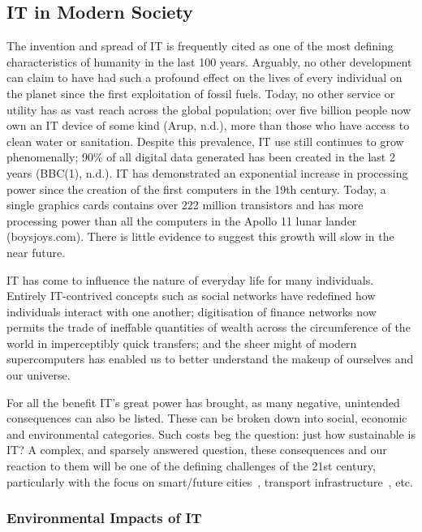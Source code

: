 \documentclass[conference]{IEEEtran}
\begin{document}
\subsection{IT in Modern Society}

The invention and spread of IT is frequently cited as one of the most
defining characteristics of humanity in the last 100 years. Arguably,
no other development can claim to have had such a profound effect on
the lives of every individual on the planet since the first
exploitation of fossil fuels. Today, no other service or utility has
as vast reach across the global population; over five billion people
now own an IT device of some kind (Arup, n.d.), more than those who
have access to clean water or sanitation. Despite this prevalence, IT
use still continues to grow phenomenally; 90\% of all digital data
generated has been created in the last 2 years (BBC(1),
n.d.). IT has demonstrated an exponential increase in
processing power since the creation of the first computers in the 19th
century. Today, a single graphics cards contains over 222 million
transistors and has more processing power than all the computers in
the Apollo 11 lunar lander (boysjoys.com). There is little evidence to
suggest this growth will slow in the near future.

IT has come to influence the nature of everyday life for many
individuals. Entirely IT-contrived concepts such as social networks
have redefined how individuals interact with one another; digitisation
of finance networks now permits the trade of ineffable quantities of
wealth across the circumference of the world in imperceptibly quick
transfers; and the sheer might of modern supercomputers has enabled us
to better understand the makeup of ourselves and our universe.

For all the benefit IT’s great power has brought, as many negative,
unintended consequences can also be listed. These can be broken down
into social, economic and environmental categories. Such costs beg the
question: just how sustainable is IT? A complex, and sparsely answered
question, these consequences and our reaction to them will be one of
the defining challenges of the 21st century, particularly with the
focus on smart/future cities~\cite{cosgrave-et-al:2014}, transport
infrastructure~\cite{cooper-et-al-sose}, etc.

\subsubsection{Environmental Impacts of IT}
\end{document}
